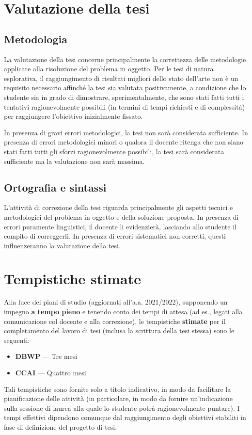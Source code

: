\section{Valutazione della tesi}

\subsection{Metodologia}

La valutazione della tesi concerne principalmente la correttezza delle metodologie applicate alla risoluzione del problema in oggetto. Per le tesi di natura esplorativa, il raggiungimento di risultati migliori dello stato dell'arte non è un requisito necessario affinché la tesi sia valutata positivamente, a condizione che lo studente sia in grado di dimostrare, sperimentalmente, che sono stati fatti tutti i tentativi ragionevolmente possibili (in termini di tempi richiesti e di complessità) per raggiungere l'obiettivo inizialmente fissato.

In presenza di gravi errori metodologici, la tesi non sarà considerata sufficiente. In presenza di errori metodologici minori o qualora il docente ritenga che non siano stati fatti tutti gli sforzi ragionevolmente possibili, la tesi sarà considerata sufficiente ma la valutazione non sarà massima.

\subsection{Ortografia e sintassi}

L'attività di correzione della tesi riguarda principalmente gli aspetti tecnici e metodologici del problema in oggetto e della soluzione proposta. In presenza di errori puramente linguistici, il docente li evidenzierà, lasciando allo studente il compito di correggerli. In presenza di errori sistematici non corretti, questi influenzeranno la valutazione della tesi.

\section{Tempistiche stimate}

Alla luce dei piani di studio (aggiornati all'a.a. 2021/2022), supponendo un impegno \textbf{a tempo pieno} e tenendo conto dei tempi di attesa (ad es., legati alla comunicazione col docente e alla correzione), le tempistiche \textbf{stimate} per il completamento del lavoro di tesi (inclusa la scrittura della tesi stessa) sono le seguenti:
\begin{itemize}
    \item \textbf{DBWP} --- Tre mesi
    \item \textbf{CCAI} --- Quattro mesi
\end{itemize}

Tali tempistiche sono fornite solo a titolo indicativo, in modo da facilitare la pianificazione delle attività (in particolare, in modo da fornire un'indicazione sulla sessione di laurea alla quale lo studente potrà ragionevolmente puntare). I tempi effettivi dipendono comunque dal raggiungimento degli obiettivi stabiliti in fase di definizione del progetto di tesi.